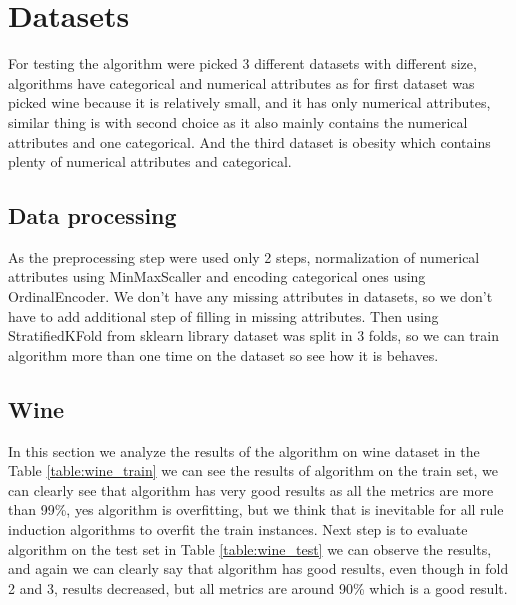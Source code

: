 \documentclass{article}
\begin{document}
\newpage
\section{Datasets}
For testing the algorithm were picked 3 different datasets with different size, algorithms have categorical and numerical attributes as for first dataset was picked wine
because it is relatively small, and it has only numerical attributes, similar thing is with second choice as it also mainly contains the numerical attributes and one categorical.
And the third dataset is obesity which contains plenty of numerical attributes and categorical. 

\subsection{Data processing}
As the preprocessing step were used only 2 steps, normalization of numerical attributes using MinMaxScaller and encoding categorical ones using OrdinalEncoder. We 
don't have any missing attributes in datasets, so we don't have to add additional step of filling in missing attributes. Then using StratifiedKFold from sklearn
library \cite{pedregosa2011scikit} dataset was split in 3 folds, so we can train algorithm more than one time on the dataset so see how it is behaves.
\subsection{Wine}
In this section we analyze the results of the algorithm on wine dataset in the Table \ref{table:wine_train} we can see
the results of algorithm on the train set, we can clearly see that algorithm has very good results as all the metrics
are more than 99\%, yes algorithm is overfitting, but we think that is inevitable for all rule induction algorithms to 
overfit the train instances. Next step is to evaluate algorithm on the test set in Table \ref{table:wine_test} we can
observe the results, and again we can clearly say that algorithm has good results, even though in fold 2 and 3, results 
decreased, but all metrics are around 90\% which is a good result.  \\
\end{document}
